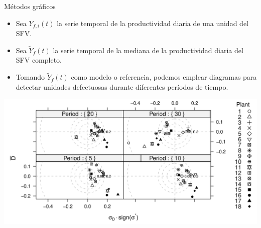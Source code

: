 \documentclass[aspectratio=169, usenames,svgnames,dvipsnames]{beamer}
\begin{document}
\begin{frame}[label={sec:org06db2ae}]{Métodos gráficos}
\begin{itemize}
\item Sea \(Y_{f,i}(t)\) la serie temporal de la productividad diaria de \alert{una unidad} del SFV.
\item Sea \(\widetilde{Y}_{f}(t)\) la serie temporal de la \alert{mediana} de la productividad diaria del SFV \alert{completo}.
\item Tomando \(\widetilde{Y}_{f}(t)\) como modelo o referencia, podemos
emplear diagramas para detectar unidades defectuosas durante diferentes
períodos de tiempo.
\end{itemize}

\begin{center}
\includegraphics[height=0.6\textheight]{../figs/TargetDiagram_Dia120.pdf}
\end{center}
\end{frame}
\end{document}
